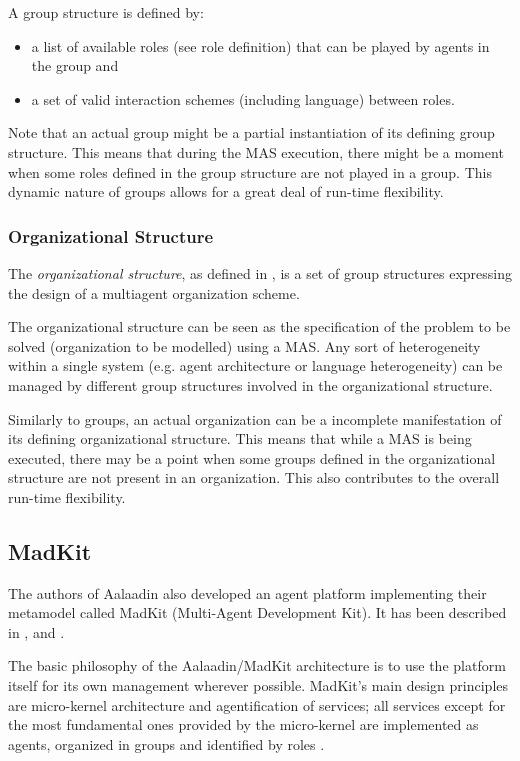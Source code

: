 A group structure is defined by:
\begin{itemize}
	\item a list of available roles (see role definition) that can be played by agents in the group and
	\item a set of valid interaction schemes (including language) between roles.
\end{itemize}

Note that an actual group might be a partial instantiation of its defining group structure.
This means that during the MAS execution, there might be a moment when some roles defined in the group structure are not played in a group.
This dynamic nature of groups allows for a great deal of run-time flexibility.

\subsubsection*{Organizational Structure}

The \textit{organizational structure}, as defined in \cite{Ferber97}, is a set of group structures expressing the design of a multiagent organization scheme.

The organizational structure can be seen as the specification of the problem to be solved (organization to be modelled) using a MAS.
Any sort of heterogeneity within a single system (e.g. agent architecture or language heterogeneity) can be managed by different group structures involved in the organizational structure.

Similarly to groups, an actual organization can be a incomplete manifestation of its defining organizational structure.
This means that while a MAS is being executed, there may be a point when some groups defined in the organizational structure are not present in an organization.
This also contributes to the overall run-time flexibility.

\subsection{MadKit}

The authors of Aalaadin also developed an agent platform implementing their metamodel called MadKit (Multi-Agent Development Kit).
It has been described in \cite{Ferber97}, \cite{Ferber98} and \cite{Gutknecht00}.

The basic philosophy of the Aalaadin/MadKit architecture is to use the platform itself for its own management wherever possible.
MadKit's main design principles are micro-kernel architecture and agentification of services;
all services except for the most fundamental ones provided by the micro-kernel are implemented as agents, organized in groups and identified by roles \cite{Ferber98}.
